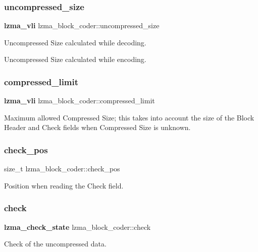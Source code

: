 \subsubsection{uncompressed\+\_\+size}
{\footnotesize\ttfamily \textbf{ lzma\+\_\+vli} lzma\+\_\+block\+\_\+coder\+::uncompressed\+\_\+size}



Uncompressed Size calculated while decoding. 

Uncompressed Size calculated while encoding. \mbox{\label{structlzma__block__coder_affdde33879d0de53dc8c92aca3a298d1}} 
\subsubsection{compressed\+\_\+limit}
{\footnotesize\ttfamily \textbf{ lzma\+\_\+vli} lzma\+\_\+block\+\_\+coder\+::compressed\+\_\+limit}

Maximum allowed Compressed Size; this takes into account the size of the Block Header and Check fields when Compressed Size is unknown. \mbox{\label{structlzma__block__coder_a1cd9a2b3c5e44f1210bb88425be6c9ca}} 
\subsubsection{check\+\_\+pos}
{\footnotesize\ttfamily size\+\_\+t lzma\+\_\+block\+\_\+coder\+::check\+\_\+pos}



Position when reading the Check field. 

\mbox{\label{structlzma__block__coder_a0a019ad945822110027367d0b7fc54b2}} 
\subsubsection{check}
{\footnotesize\ttfamily \textbf{ lzma\+\_\+check\+\_\+state} lzma\+\_\+block\+\_\+coder\+::check}



Check of the uncompressed data. 

